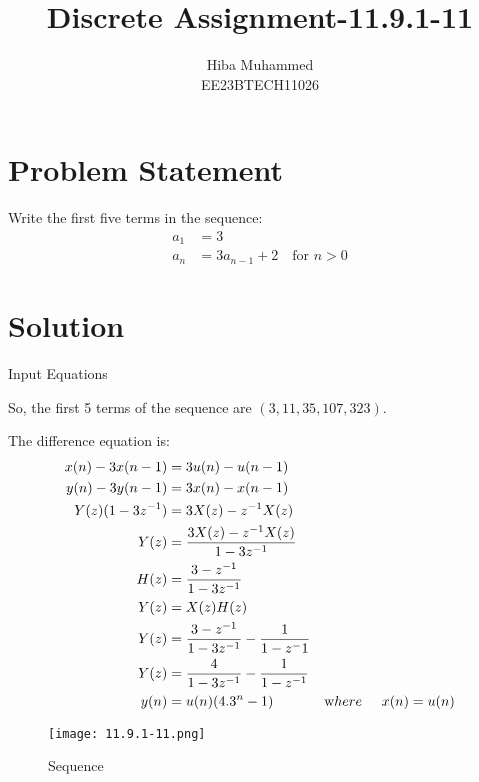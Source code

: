 \documentclass[12pt]{article}
\title{Discrete Assignment-11.9.1-11}
\author{Hiba Muhammed \\
        EE23BTECH11026}
\date{}
\begin{document}
\maketitle

\section*{Problem Statement}
Write the first five terms in the sequence:
\begin{align}
a_{1}  &= 3 \\
a_{n}  &= 3a_{n-1} + 2 \quad \text{for } n > 0
\end{align}

\section*{Solution}

\begin{table}[h]
  \centering
  
  \caption{Input Equations}
  \label{tab:input-equations}
\end{table}

So, the first 5 terms of the sequence are \( (3, 11, 35, 107, 323) \).

The difference equation is:
\begin{align}
x(n) - 3x(n-1) &= 3u(n) - u(n-1) \\
y(n) - 3y(n-1) &= 3x(n) - x(n-1)\\
Y(z)(1 - 3z^{-1}) &= 3X(z) - z^{-1}X(z) \\
Y(z) &= \frac{3X(z) - z^{-1}X(z)}{1 - 3z^{-1}}\\
H(z) &= \frac{3 - z^{-1}}{1 - 3z^{-1}}\\
Y(z) &=X(z)H(z) \\
Y(z)&=\frac{3 - z^{-1}}{1-3z^{-1}}-\frac{1}{1-z^-1}\\
Y(z)&=\frac{4}{1-3z^{-1}}-\frac{1}{1-z^{-1}}\\
y(n)&=u(n)(4.3^{n}-1) &\text where \hspace{0.5cm}x(n)=u(n)
\end{align}

\begin{figure}[h]
    \centering
    \texttt{[image: 11.9.1-11.png]}
    \caption{Sequence}
\end{figure}
\end{document}
